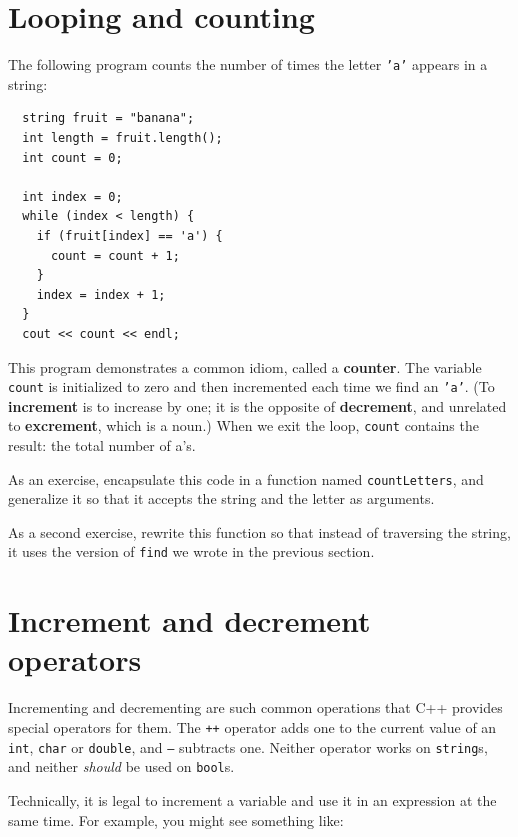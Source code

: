 \section{Looping and counting}
\label{loopcount}

The following program counts the
number of times the letter {\tt 'a'} appears in a string:

\begin{verbatim}
  string fruit = "banana";
  int length = fruit.length();
  int count = 0;

  int index = 0;
  while (index < length) {
    if (fruit[index] == 'a') {
      count = count + 1;
    }
    index = index + 1;
  }
  cout << count << endl;
\end{verbatim}
%
This program demonstrates a common idiom, called a {\bf counter}.  The
variable {\tt count} is initialized to zero and then incremented each
time we find an {\tt 'a'}.  (To {\bf increment} is to increase by one;
it is the opposite of {\bf decrement}, and unrelated to {\bf
excrement}, which is a noun.)  When we exit the loop, {\tt count}
contains the result: the total number of a's.


As an exercise, encapsulate this code in a function named
{\tt countLetters}, and generalize it so that it accepts the
string and the letter as arguments.


As a second exercise, rewrite this function so that instead
of traversing the string, it uses the version of
{\tt find} we wrote in the previous section.

\section{Increment and decrement operators}

Incrementing and decrementing are such common operations that C++
provides special operators for them.  The {\tt ++} operator adds one
to the current value of an {\tt int}, {\tt char} or {\tt double}, and
{\tt --} subtracts one.  Neither operator works on {\tt string}s,
and neither {\em should} be used on {\tt bool}s.

Technically, it is legal to increment a variable and use it
in an expression at the same time.  For example, you might see
something like:

